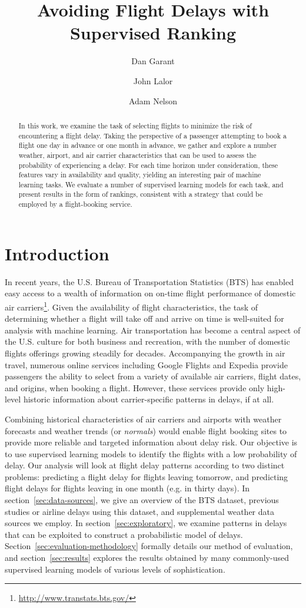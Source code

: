 \documentclass{article}
\title{Avoiding Flight Delays with Supervised Ranking}
\author{Dan Garant \and John Lalor \and Adam Nelson}
\date{}
\begin{document}
\maketitle

\begin{abstract}
In this work, we examine the task of selecting flights to minimize the risk of encountering a flight delay.
Taking the perspective of a passenger attempting to book a flight one day in advance or one month in advance, we gather and explore a number weather, airport, and air carrier characteristics that can be used to assess the probability of experiencing a delay. For each time horizon under consideration, these features vary in availability and quality, yielding an interesting pair of machine learning tasks. We evaluate a number of supervised learning models for each task, and present results in the form of rankings, consistent with a strategy that could be employed by a flight-booking service.
\end{abstract}

\section{Introduction}

In recent years, the U.S. Bureau of Transportation Statistics (BTS)  has enabled easy access to a wealth of information on on-time flight performance of domestic air carriers\footnote{\url{http://www.transtats.bts.gov/}}.
Given the availability of flight characteristics, the task of determining whether a flight will take off and arrive on time is well-suited for analysis with machine learning.
Air transportation has become a central aspect of the U.S. culture for both business and recreation, with the number of domestic flights offerings growing steadily for decades.
Accompanying the growth in air travel, numerous online services including Google Flights and Expedia provide passengers the ability to select from a variety of available air carriers, flight dates, and origins, when booking a flight.
However, these services provide only high-level historic information about carrier-specific patterns in delays, if at all.

Combining historical characteristics of air carriers and airports with weather forecasts and weather trends (or \emph{normals}) would enable flight booking sites to provide more reliable and targeted information about delay risk.
Our objective is to use supervised learning models to identify the flights with a low probability of delay. Our analysis will look at flight delay patterns according to two distinct problems: predicting a flight delay for flights leaving tomorrow, and predicting flight delays for flights leaving in one month (e.g. in thirty days).
In section~\ref{sec:data-sources}, we give an overview of the BTS dataset, previous studies or airline delays using this dataset, and supplemental weather data sources we employ.
In section~\ref{sec:exploratory}, we examine patterns in delays that can be exploited to construct a probabilistic model of delays.
Section~\ref{sec:evaluation-methodology} formally details our method of evaluation, and section~\ref{sec:results} explores the results obtained by many commonly-used supervised learning models of various levels of sophistication.
\end{document}
